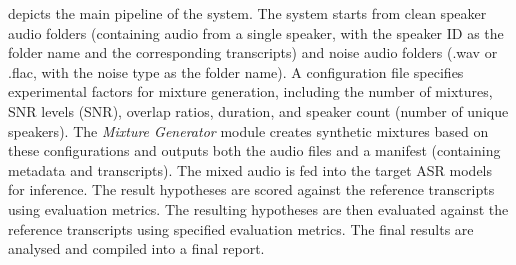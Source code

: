  depicts the main pipeline of the system. The system starts from clean speaker audio folders (containing audio from a single speaker, with the speaker ID as the folder name and the corresponding transcripts) and noise audio folders (.wav or .flac, with the noise type as the folder name). A configuration file specifies experimental factors for mixture generation, including the number of mixtures, SNR levels (SNR), overlap ratios, duration, and speaker count (number of unique speakers). The \emph{Mixture Generator} module creates synthetic mixtures based on these configurations and outputs both the audio files and a manifest (containing metadata and transcripts). The mixed audio is fed into the target ASR models for inference. The result hypotheses are scored against the reference transcripts using evaluation metrics. The resulting hypotheses are then evaluated against the reference transcripts using specified evaluation metrics. The final results are analysed and compiled into a final report.

